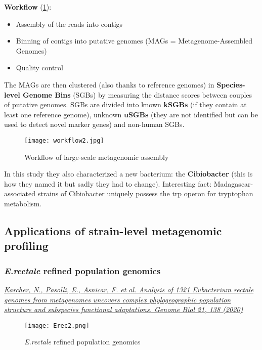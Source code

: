 \textbf{Workflow} (\ref{fig:workflow2}):
\begin{itemize}
    \item Assembly of the reads into contigs
    \item Binning of contigs into putative genomes (MAGs = Metagenome-Assembled Genomes)
    \item Quality control
\end{itemize}

The MAGs are then clustered (also thanks to reference genomes) in \textbf{Species-level Genome Bins} (SGBs) by measuring the distance scores between couples of putative genomes. SGBs are divided into known \textbf{kSGBs} (if they contain at least one reference genome), unknown \textbf{uSGBs} (they are not identified but can be used to detect novel marker genes) and non-human SGBs. \\

\begin{figure}[h]
\centering
\texttt{[image: workflow2.jpg]}
\caption{\label{fig:workflow2}Workflow of large-scale metagenomic assembly}
\end{figure}

In this study they also characterized a new bacterium: the \textbf{Cibiobacter} (this is how they named it but sadly they had to change). Interesting fact: Madagascar-associated strains of Cibiobacter uniquely possess the trp operon for tryptophan metabolism.

\subsection{Applications of strain-level metagenomic profiling}

\subsubsection{\emph{E.rectale} refined population genomics}

\href{https://genomebiology.biomedcentral.com/articles/10.1186/s13059-020-02042-y}{\emph{Karcher, N., Pasolli, E., Asnicar, F. et al. Analysis of 1321 Eubacterium rectale genomes from metagenomes uncovers complex phylogeographic population structure and subspecies functional adaptations. Genome Biol 21, 138 (2020)}}\\

\begin{figure}[!h]
\centering
\texttt{[image: Erec2.png]}
\caption{\label{fig:Erec2}\emph{E.rectale} refined population genomics}
\end{figure}

